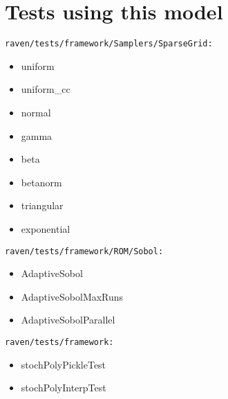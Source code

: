 \documentclass[11pt]{article}
\begin{document}
\section{Tests using this model}
\texttt{raven/tests/framework/Samplers/SparseGrid:}
\begin{itemize}
  \item uniform
  \item uniform\_cc
  \item normal
  \item gamma
  \item beta
  \item betanorm
  \item triangular
  \item exponential
\end{itemize}
\texttt{raven/tests/framework/ROM/Sobol:}
\begin{itemize}
  \item AdaptiveSobol
  \item AdaptiveSobolMaxRuns
  \item AdaptiveSobolParallel
\end{itemize}
\texttt{raven/tests/framework:}
\begin{itemize}
  \item stochPolyPickleTest
  \item stochPolyInterpTest
\end{itemize}
\end{document}

